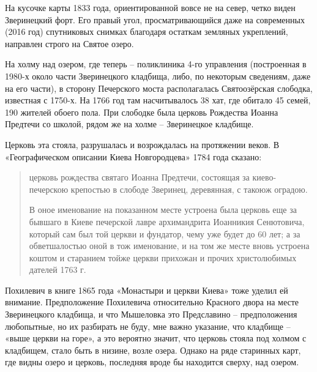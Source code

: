 На кусочке карты 1833 года, ориентированной вовсе не на север, четко виден Зверинецкий форт. Его правый угол, просматривающийся даже на современных (2016 год) спутниковых снимках благодаря остаткам земляных укреплений, направлен строго на Святое озеро.

На холму над озером, где теперь – поликлиника 4-го управления (построенная в 1980-х около части Зверинецкого кладбища, либо, по некоторым сведениям, даже на его части), в сторону Печерского моста располагалась Святоозёрская слободка, известная с 1750-х. На 1766 год там насчитывалось 38 хат, где обитало 45 семей, 190 жителей обоего пола. При слободке была церковь Рождества Иоанна Предтечи со школой, рядом же на холме – Зверинецкое кладбище.

Церковь эта стояла, разрушалась и возрождалась на протяжении веков. В «Географическом описании Киева Новгородцева» 1784 года\cite{sbornikmat} сказано:

\begin{quotation}
церковь рождества святаго Иоанна Предтечи, состоящая за киево-печерскою крепостью в слободе Зверинец, деревянная, с такоюж оградою.

В оное именование на показанном месте устроена была церковь еще за бывшаго в Киеве печерской лавре архимандрита Иоанникия Сенютовича, который сам был той церкви и фундатор, чему уже будет до 60 лет; а за обветшалостью оной в тож именование, и на том же месте вновь устроена коштом и старанием тойже церкви прихожан и прочих христолюбимых дателей 1763 г.
\end{quotation}

Похилевич в книге 1865 года «Монастыри и церкви Киева» тоже уделил ей внимание. Предположение Похилевича относительно Красного двора на месте Зверинецкого кладбища, и что Мышеловка это Предславино – предположения любопытные, но их разбирать не буду, мне важно указание, что кладбище – «выше церкви на горе», а это вероятно значит, что церковь стояла под холмом с кладбищем, стало быть в низине, возле озера. Однако на ряде старинных карт, где видны озеро и церковь, последняя вроде бы находится сверху, над озером.

